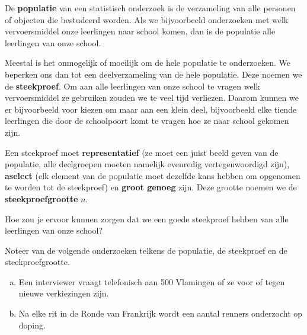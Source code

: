 \documentclass[12pt,twoside]{article}
\begin{document}
De {\bf populatie} van een statistisch onderzoek is de verzameling van alle personen of objecten die bestudeerd worden. Als we bijvoorbeeld onderzoeken met welk vervoersmiddel onze leerlingen naar school komen, dan is de populatie alle leerlingen van onze school.

Meestal is het onmogelijk of moeilijk om de hele populatie te onderzoeken. We beperken ons dan tot een deelverzameling van de hele populatie. Deze noemen we de {\bf steekproef}. Om aan alle leerlingen van onze school te vragen welk vervoersmiddel ze gebruiken zouden we te veel tijd verliezen. Daarom kunnen we er bijvoorbeeld voor kiezen om maar aan een klein deel, bijvoorbeeld elke tiende leerlingen die door de schoolpoort komt te vragen hoe ze naar school gekomen zijn.

Een steekproef moet {\bf representatief} (ze moet een juist beeld geven van de populatie, alle deelgroepen moeten namelijk evenredig vertegenwoordigd zijn), {\bf aselect} (elk element van de populatie moet dezelfde kans hebben om opgenomen te worden tot de steekproef) en {\bf groot genoeg} zijn. Deze grootte noemen we de {\bf steekproefgrootte} $n$.

\begin{oefening}
Hoe zou je ervoor kunnen zorgen dat we een goede steekproef hebben van alle leerlingen van onze school?
\end{oefening}


\begin{oefening}
Noteer van de volgende onderzoeken telkens de populatie, de steekproef en de steekproefgrootte.
\begin{enumerate}[(a)]
  \item Een interviewer vraagt telefonisch aan 500 Vlamingen of ze voor of tegen nieuwe verkiezingen zijn.
  \item Na elke rit in de Ronde van Frankrijk wordt een aantal renners onderzocht op doping.
\end{enumerate}
\end{oefening}
\end{document}
